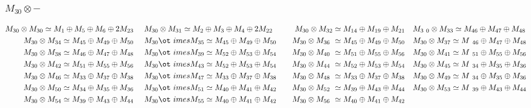 \subsubsection{$M_30\otimes -$}
\begin{align*}
M_{30} \otimes M_{30} \simeq M_{1} \oplus M_{5} \oplus M_{6} \oplus 2 M_{23} &\
&& M_{30} \otimes M_{31} \simeq M_{2} \oplus M_{3} \oplus M_{4} \oplus 2 M_{22\
} &&& M_{30} \otimes M_{32} \simeq M_{14} \oplus M_{19} \oplus M_{21} &&& M_{3\
0} \otimes M_{33} \simeq M_{46} \oplus M_{47} \oplus M_{48}\\
M_{30} \otimes M_{34} \simeq M_{45} \oplus M_{49} \oplus M_{50} &&& M_{30} \ot\
imes M_{35} \simeq M_{45} \oplus M_{49} \oplus M_{50} &&& M_{30} \otimes M_{36\
} \simeq M_{45} \oplus M_{49} \oplus M_{50} &&& M_{30} \otimes M_{37} \simeq M\
_{46} \oplus M_{47} \oplus M_{48}\\
M_{30} \otimes M_{38} \simeq M_{46} \oplus M_{47} \oplus M_{48} &&& M_{30} \ot\
imes M_{39} \simeq M_{52} \oplus M_{53} \oplus M_{54} &&& M_{30} \otimes M_{40\
} \simeq M_{51} \oplus M_{55} \oplus M_{56} &&& M_{30} \otimes M_{41} \simeq M\
_{51} \oplus M_{55} \oplus M_{56}\\
M_{30} \otimes M_{42} \simeq M_{51} \oplus M_{55} \oplus M_{56} &&& M_{30} \ot\
imes M_{43} \simeq M_{52} \oplus M_{53} \oplus M_{54} &&& M_{30} \otimes M_{44\
} \simeq M_{52} \oplus M_{53} \oplus M_{54} &&& M_{30} \otimes M_{45} \simeq M\
_{34} \oplus M_{35} \oplus M_{36}\\
M_{30} \otimes M_{46} \simeq M_{33} \oplus M_{37} \oplus M_{38} &&& M_{30} \ot\
imes M_{47} \simeq M_{33} \oplus M_{37} \oplus M_{38} &&& M_{30} \otimes M_{48\
} \simeq M_{33} \oplus M_{37} \oplus M_{38} &&& M_{30} \otimes M_{49} \simeq M\
_{34} \oplus M_{35} \oplus M_{36}\\
M_{30} \otimes M_{50} \simeq M_{34} \oplus M_{35} \oplus M_{36} &&& M_{30} \ot\
imes M_{51} \simeq M_{40} \oplus M_{41} \oplus M_{42} &&& M_{30} \otimes M_{52\
} \simeq M_{39} \oplus M_{43} \oplus M_{44} &&& M_{30} \otimes M_{53} \simeq M\
_{39} \oplus M_{43} \oplus M_{44}\\
M_{30} \otimes M_{54} \simeq M_{39} \oplus M_{43} \oplus M_{44} &&& M_{30} \ot\
imes M_{55} \simeq M_{40} \oplus M_{41} \oplus M_{42} &&& M_{30} \otimes M_{56\
} \simeq M_{40} \oplus M_{41} \oplus M_{42}\\
\end{align*}

